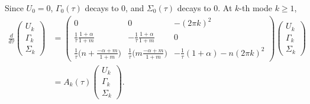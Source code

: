 \documentclass[a4paper,11pt]{article}
\theoremstyle{remark}
\begin{document}
Since $U_0=0$, $\Gamma_0(\tau)$ decays to $0$, and $\Sigma_0(\tau)$ decays to $0$.
At $k$-th mode $k\ge1$,
\begin{align}
  \frac{d}{d\tau}
  \begin{pmatrix}
   U_k \\ \Gamma_k \\ \Sigma_k
  \end{pmatrix} &=
  \begin{pmatrix}
   0 & 0 & -(2\pi k)^2\\
   \frac{1}{\tau}\frac{1+\alpha}{1+m} & -\frac{1}{\tau}\frac{1+\alpha}{1+m} & 0\\
   \frac{1}{\tau}\Big( n+ \frac{-\alpha+m}{1+m}\Big) &
   \frac{1}{\tau}\Big(m\frac{-\alpha+m}{1+m}\Big) &
   -\frac{1}{\tau}(1+\alpha) -n(2\pi k)^2
  \end{pmatrix}
  \begin{pmatrix}
   U_k \\ \Gamma_k \\ \Sigma_k
  \end{pmatrix} \nonumber\\
  &=A_k(\tau)\begin{pmatrix}
   U_k \\ \Gamma_k \\ \Sigma_k
  \end{pmatrix}.  \label{eq:k-system}
\end{align}
\end{document}
